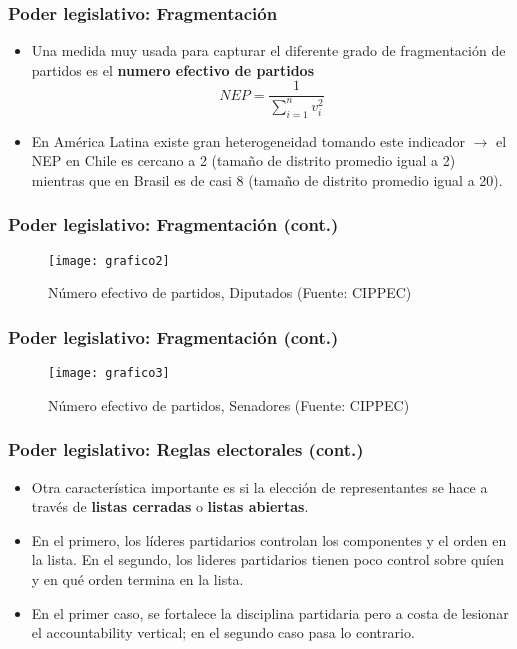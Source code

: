 \documentclass[14pt,aspectratio=169]{beamer}
\begin{document}
  
  \begin{frame}\frametitle{Poder legislativo: Fragmentación}
    \begin{itemize}
    \item Una medida muy usada para capturar el diferente grado de
  fragmentación de partidos es el \textbf{numero efectivo de partidos}
  \begin{equation*}
NEP=\frac{1}{\sum_{i=1}^{n}v_{i}^2}
\end{equation*}
\item En América Latina existe gran heterogeneidad tomando este
  indicador $\longrightarrow$ el NEP en Chile es cercano a 2 (tamaño
  de distrito promedio igual a 2)
  mientras que en Brasil es de casi 8 (tamaño de distrito promedio
  igual a 20). 
      \end{itemize}
    \end{frame}


    \begin{frame}\frametitle{Poder legislativo: Fragmentación (cont.)}
 \begin{figure}[htbp]
    \centering 
    \texttt{[image: grafico2]}
    \caption{Número efectivo de partidos, Diputados (Fuente: CIPPEC)}
    \label{fig:1}
  \end{figure}
    \end{frame}


    
 \begin{frame}\frametitle{Poder legislativo: Fragmentación (cont.)}
 \begin{figure}[htbp]
    \centering
    \texttt{[image: grafico3]}
    \caption{Número efectivo de partidos, Senadores (Fuente: CIPPEC)}
    \label{fig:1}
  \end{figure}
    \end{frame}




    
    

  \begin{frame}\frametitle{Poder legislativo: Reglas electorales (cont.)}
    \begin{itemize}
    \item Otra característica importante es si la elección de
      representantes se hace a través de \textbf{listas cerradas} o
      \textbf{listas abiertas}.
      \item En el primero, los líderes partidarios
      controlan los componentes y el orden en la lista. En el segundo,
      los lideres partidarios tienen poco control sobre quíen y en qué
      orden termina en la lista.
      \item En el primer caso, se fortalece la disciplina partidaria
        pero a costa de lesionar el accountability vertical; en el
        segundo caso pasa lo contrario. 
    \end{itemize}
    \end{frame}
    
\end{document}

